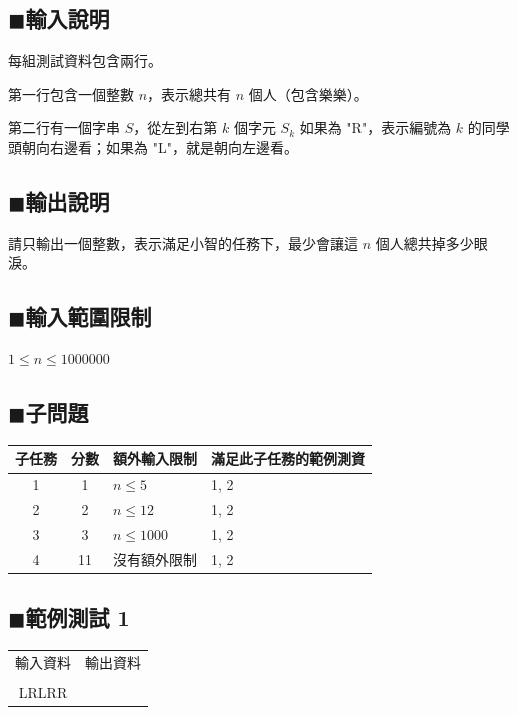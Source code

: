 \documentclass[12pt,a4paper]{article}
\begin{document}
\subsection*{$\blacksquare$輸入說明}
每組測試資料包含兩行。\par
第一行包含一個整數 $n$，表示總共有 $n$ 個人（包含樂樂）。\par
第二行有一個字串 $S$，從左到右第 $k$ 個字元 $S_k$ 如果為 "R"，表示編號為 $k$ 的同學頭朝向右邊看；如果為 "L"，就是朝向左邊看。\par

\subsection*{$\blacksquare$輸出說明}
請只輸出一個整數，表示滿足小智的任務下，最少會讓這 $n$ 個人總共掉多少眼淚。\par

\subsection*{$\blacksquare$輸入範圍限制}
\( 1 \leq n \leq 1 000 000 \) \par


\subsection*{$\blacksquare$子問題}
\begin{table}[h]
\centering
\begin{tabular}{ccll}
\toprule[1.5pt]
\textbf{子任務}&\textbf{分數}&\multicolumn{1}{c}{\textbf{額外輸入限制}}&\multicolumn{1}{c}{\textbf{滿足此子任務的範例測資}}\\
\midrule[1.5pt]
1&1& $n \leq 5 $ &1, 2\\
\midrule[0.75pt]
2&2& $n \leq 12 $ &1, 2\\
\midrule[0.75pt]
3&3& $n \leq 1000 $ &1, 2\\
\midrule[0.75pt]
4&11& 沒有額外限制&1, 2\\
\bottomrule[1.5pt]
\end{tabular}
\end{table}


\subsection*{$\blacksquare$範例測試 1}
\begin{tabular}{cc}
輸入資料&輸出資料\\ 
\framebox{\begin{minipage}{0.45\linewidth}
\texttt{5\\
LRLRR
}
\end{minipage}}
&
\framebox{\begin{minipage}{0.45\linewidth}
\texttt{1
}\end{minipage}}\\ 
\end{tabular}




\newpage
\end{document}
